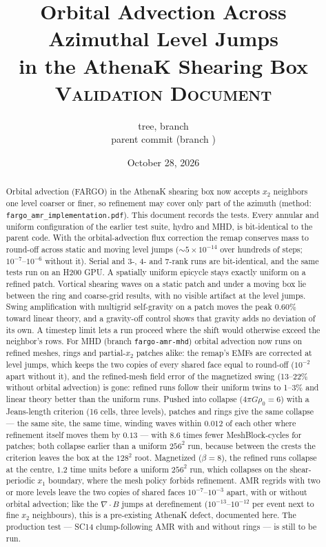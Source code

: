 \documentclass[11pt]{article}
\title{Orbital Advection Across Azimuthal Level Jumps\\
       in the AthenaK Shearing Box\\[0.4em]
       \large \textsc{Validation Document}}
\author{\code{athenak-multigrid} tree, branch \code{fargo-amr}\\
        \small parent commit \code{d3edb948} (branch \code{dust-multigrid})}
\date{October 28, 2026}
\newcommand{\code}[1]{\texttt{#1}}
\newcommand{\file}[1]{\texttt{\small #1}}
\begin{document}
\maketitle

\begin{abstract}
\noindent
Orbital advection (FARGO) in the AthenaK shearing box now accepts $x_2$ neighbors one
level coarser or finer, so refinement may cover only part of the azimuth (method:
\file{fargo\_amr\_implementation.pdf}). This document records the tests. Every annular
and uniform configuration of the earlier test suite, hydro and MHD, is bit-identical to
the parent code. With the orbital-advection flux correction the remap conserves mass to
round-off across static and moving level jumps ($\sim5\times10^{-14}$ over hundreds of
steps; $10^{-7}$--$10^{-6}$ without it). Serial and 3-, 4- and 7-rank runs are
bit-identical, and the same tests run on an H200 GPU. A spatially uniform epicycle stays exactly uniform on a refined patch.
Vortical shearing waves on a static patch and under a moving box lie between the ring and
coarse-grid results, with no visible artifact at the level jumps. Swing amplification
with multigrid self-gravity on a patch moves the peak $0.60\%$ toward linear theory, and a
gravity-off control shows that gravity adds no deviation of its own. A timestep limit
lets a run proceed where the shift would otherwise exceed the neighbor's rows. For MHD
(branch \code{fargo-amr-mhd}) orbital advection now runs on refined meshes, rings and
partial-$x_2$ patches alike: the remap's EMFs are corrected at level jumps, which keeps the
two copies of every shared face equal to round-off ($10^{-2}$ apart without it), and the
refined-mesh field error of the magnetized swing (13--22\% without orbital advection) is
gone: refined runs follow their uniform twins to 1--3\% and linear theory better than the
uniform runs. Pushed into collapse ($4\pi G\rho_0 = 6$) with a Jeans-length criterion
(16 cells, three levels), patches and rings give the same collapse --- the same site, the
same time, winding waves within $0.012$ of each other where refinement itself moves them by
$0.13$ --- with $8.6$ times fewer MeshBlock-cycles for patches; both collapse earlier than a
uniform $256^2$ run, because between the crests the criterion leaves the box at the
$128^2$ root. Magnetized ($\beta = 8$), the refined runs collapse at the centre, $1.2$
time units before a uniform $256^2$ run, which collapses on the shear-periodic $x_1$
boundary, where the mesh policy forbids refinement. AMR regrids with two or more levels leave the two copies of shared faces
$10^{-7}$--$10^{-3}$ apart, with or without orbital advection; like the $\nabla\!\cdot\!B$
jumps at derefinement ($10^{-13}$--$10^{-12}$ per event next to fine $x_2$ neighbours), this
is a pre-existing AthenaK defect, documented here. The production test
--- SC14 clump-following AMR with and without rings --- is still to be run.
\end{abstract}
\end{document}
